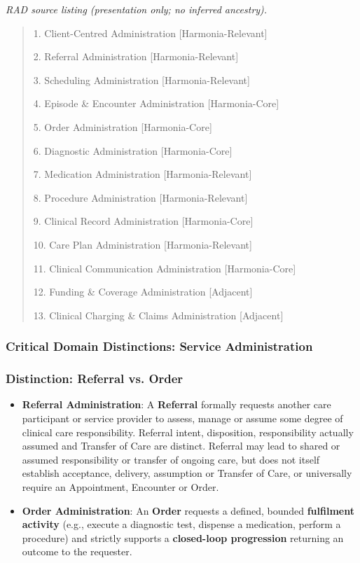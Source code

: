 \textit{RAD source listing (presentation only; no inferred ancestry).}
\begin{quote}
1. Client-Centred Administration [Harmonia-Relevant]

2. Referral Administration [Harmonia-Relevant]

3. Scheduling Administration [Harmonia-Relevant]

4. Episode \& Encounter Administration [Harmonia-Core]

5. Order Administration [Harmonia-Core]

6. Diagnostic Administration [Harmonia-Core]

7. Medication Administration [Harmonia-Relevant]

8. Procedure Administration [Harmonia-Relevant]

9. Clinical Record Administration [Harmonia-Core]

10. Care Plan Administration [Harmonia-Relevant]

11. Clinical Communication Administration [Harmonia-Core]

12. Funding \& Coverage Administration [Adjacent]

13. Clinical Charging \& Claims Administration [Adjacent]
\end{quote}
\label{rad:enabling:256}
\subsubsection*{Critical Domain Distinctions: Service Administration}
\label{rad:enabling:258}
\subsubsection*{Distinction: Referral vs. Order}
\label{rad:enabling:259}

\begin{itemize}

\item 
\textbf{Referral Administration}: A \textbf{Referral} formally requests another care participant or service provider to assess, manage or assume some degree of clinical care responsibility. Referral intent, disposition, responsibility actually assumed and Transfer of Care are distinct. Referral may lead to shared or assumed responsibility or transfer of ongoing care, but does not itself establish acceptance, delivery, assumption or Transfer of Care, or universally require an Appointment, Encounter or Order.



\item 
\textbf{Order Administration}: An \textbf{Order} requests a defined, bounded \textbf{fulfilment activity} (e.g., execute a diagnostic test, dispense a medication, perform a procedure) and strictly supports a \textbf{closed-loop progression} returning an outcome to the requester.



\end{itemize}
\label{rad:enabling:262}
